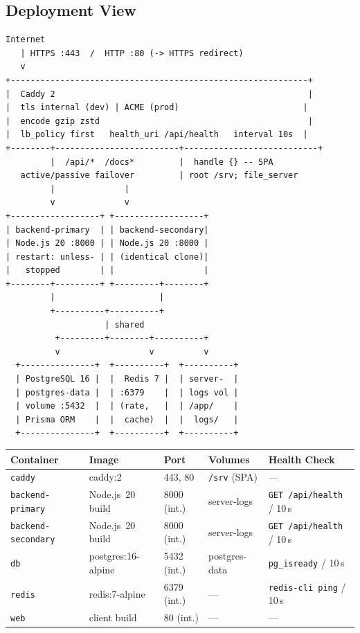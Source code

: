 \documentclass[12pt,a4paper]{article}
\begin{document}
\subsection{Deployment View}
\label{sec:deployment}

\begin{lstlisting}[caption={Container topology -- docker-compose.yml + Caddyfile}]
Internet
   | HTTPS :443  /  HTTP :80 (-> HTTPS redirect)
   v
+------------------------------------------------------------+
|  Caddy 2                                                   |
|  tls internal (dev) | ACME (prod)                         |
|  encode gzip zstd                                          |
|  lb_policy first   health_uri /api/health   interval 10s  |
+--------+-------------------------+---------------------------+
         |  /api/*  /docs*         |  handle {} -- SPA
   active/passive failover         | root /srv; file_server
         |              |
         v              v
+------------------+ +------------------+
| backend-primary  | | backend-secondary|
| Node.js 20 :8000 | | Node.js 20 :8000 |
| restart: unless- | | (identical clone)|
|   stopped        | |                  |
+--------+---------+ +---------+--------+
         |                     |
         +----------+----------+
                    | shared
          +---------+--------+----------+
          v                  v          v
  +---------------+  +----------+  +----------+
  | PostgreSQL 16 |  |  Redis 7 |  | server-  |
  | postgres-data |  | :6379    |  | logs vol |
  | volume :5432  |  | (rate,   |  | /app/    |
  | Prisma ORM    |  |  cache)  |  |  logs/   |
  +---------------+  +----------+  +----------+
\end{lstlisting}

\begin{tabularx}{\textwidth}{L{3.2cm} L{2.5cm} L{1.8cm} L{3cm} L{3.3cm}}
  \toprule
  \textbf{Container} & \textbf{Image} & \textbf{Port} & \textbf{Volumes} & \textbf{Health Check} \\
  \midrule
  \texttt{caddy}              & caddy:2            & 443, 80       & \texttt{/srv} (SPA) & --- \\
  \texttt{backend-primary}    & Node.js~20 build   & 8000 (int.)   & server-logs         & \texttt{GET /api/health} / 10\,s \\
  \texttt{backend-secondary}  & Node.js~20 build   & 8000 (int.)   & server-logs         & \texttt{GET /api/health} / 10\,s \\
  \texttt{db}                 & postgres:16-alpine & 5432 (int.)   & postgres-data       & \texttt{pg\_isready} / 10\,s \\
  \texttt{redis}              & redis:7-alpine     & 6379 (int.)   & ---                 & \texttt{redis-cli ping} / 10\,s \\
  \texttt{web}                & client build       & 80 (int.)     & ---                 & --- \\
  \bottomrule
\end{tabularx}
\end{document}
